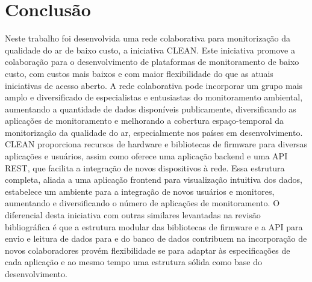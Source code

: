 \chapter*{Conclusão}
{}%
%

Neste trabalho foi desenvolvida uma rede colaborativa para monitorização da qualidade do ar de baixo custo, a iniciativa CLEAN. Este iniciativa promove a colaboração para o desenvolvimento de plataformas de monitoramento de baixo custo, com custos mais baixos e com maior flexibilidade do que as atuais iniciativas de acesso aberto. A rede colaborativa pode incorporar um grupo mais amplo e diversificado de especialistas e entusiastas do monitoramento ambiental, aumentando a quantidade de dados disponíveis publicamente, diversificando as aplicações de monitoramento e melhorando a cobertura espaço-temporal da monitorização da qualidade do ar, especialmente nos países em desenvolvimento. CLEAN proporciona recursos de hardware e bibliotecas de firmware para diversas aplicações e usuários, assim como oferece uma aplicação backend e uma API REST, que facilita a integração de novos dispositivos à rede. Essa estrutura completa, aliada a uma aplicação frontend para visualização intuitiva dos dados, estabelece um ambiente para a integração de novos usuários e monitores, aumentando e diversificando o número de aplicações de monitoramento. O diferencial desta iniciativa com outras similares levantadas na revisão bibliográfica é que a estrutura modular das bibliotecas de firmware e a API para envio e leitura de dados para e do banco de dados contribuem na incorporação de novos colaboradores provém flexibilidade se para adaptar às especificações de cada aplicação e ao mesmo tempo uma estrutura sólida como base do desenvolvimento.

